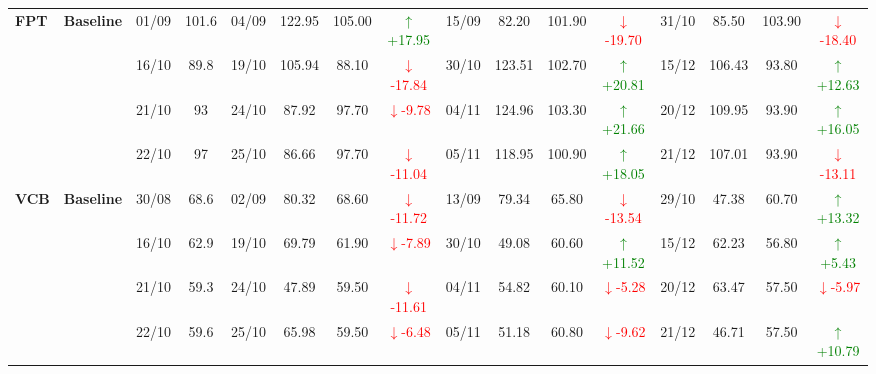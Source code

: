 {\begin{longtable}{llcc|cccc|cccc|cccc}
\multirow{4}{*}{\textbf{FPT}}
& \textbf{Baseline}
& 01/09 & 101.6 & 04/09 & 122.95 & 105.00 & \textcolor{green}{\(\uparrow\)+17.95} & 15/09 & 82.20 & 101.90 & \textcolor{red}{\(\downarrow\)-19.70} & 31/10 & 85.50 & 103.90 & \textcolor{red}{\(\downarrow\)-18.40} \\
& & 16/10 & 89.8 & 19/10 & 105.94 & 88.10 & \textcolor{red}{\(\downarrow\)-17.84} & 30/10 & 123.51 & 102.70 & \textcolor{green}{\(\uparrow\)+20.81} & 15/12 & 106.43 & 93.80 & \textcolor{green}{\(\uparrow\)+12.63} \\
& & 21/10 & 93 & 24/10 & 87.92 & 97.70 & \textcolor{red}{\(\downarrow\)-9.78} & 04/11 & 124.96 & 103.30 & \textcolor{green}{\(\uparrow\)+21.66} & 20/12 & 109.95 & 93.90 & \textcolor{green}{\(\uparrow\)+16.05} \\
& & 22/10 & 97 & 25/10 & 86.66 & 97.70 & \textcolor{red}{\(\downarrow\)-11.04} & 05/11 & 118.95 & 100.90 & \textcolor{green}{\(\uparrow\)+18.05} & 21/12 & 107.01 & 93.90 & \textcolor{red}{\(\downarrow\)-13.11} \\
\midrule

\multirow{4}{*}{\textbf{VCB}}
& \textbf{Baseline}
& 30/08 & 68.6 & 02/09 & 80.32 & 68.60 & \textcolor{red}{\(\downarrow\)-11.72} & 13/09 & 79.34 & 65.80 & \textcolor{red}{\(\downarrow\)-13.54} & 29/10 & 47.38 & 60.70 & \textcolor{green}{\(\uparrow\)+13.32} \\
& & 16/10 & 62.9 & 19/10 & 69.79 & 61.90 & \textcolor{red}{\(\downarrow\)-7.89} & 30/10 & 49.08 & 60.60 & \textcolor{green}{\(\uparrow\)+11.52} & 15/12 & 62.23 & 56.80 & \textcolor{green}{\(\uparrow\)+5.43} \\
& & 21/10 & 59.3 & 24/10 & 47.89 & 59.50 & \textcolor{red}{\(\downarrow\)-11.61} & 04/11 & 54.82 & 60.10 & \textcolor{red}{\(\downarrow\)-5.28} & 20/12 & 63.47 & 57.50 & \textcolor{red}{\(\downarrow\)-5.97} \\
& & 22/10 & 59.6 & 25/10 & 65.98 & 59.50 & \textcolor{red}{\(\downarrow\)-6.48} & 05/11 & 51.18 & 60.80 & \textcolor{red}{\(\downarrow\)-9.62} & 21/12 & 46.71 & 57.50 & \textcolor{green}{\(\uparrow\)+10.79} \\
\midrule


\end{longtable}}
